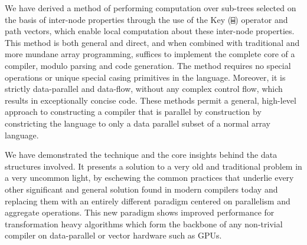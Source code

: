 ﻿\documentclass[numbers,10pt,preprint]{sigplanconf}
\begin{document}
We have derived a method of performing computation over sub-trees selected on the basis of inter-node properties through the use of the Key (\verb;⌸;) operator and path vectors, which enable local computation about these inter-node properties. This method is both general and direct, and when combined with traditional and more mundane array programming, suffices to implement the complete core of a compiler, modulo parsing and code generation. The method requires no special operations or unique special casing primitives in the language. Moreover, it is strictly data-parallel and data-flow, without any complex control flow, which results in exceptionally concise code. These methods permit a general, high-level approach to constructing a compiler that is parallel by construction by constricting the language to only a data parallel subset of a normal array language.

We have demonstrated the technique and the core insights behind the data structures involved. It presents a solution to a very old and traditional problem in a very uncommon light, by eschewing the common practices that underlie every other significant and general solution found in modern compilers today and replacing them with an entirely different paradigm centered on parallelism and aggregate operations. This new paradigm shows improved performance for transformation heavy algorithms which form the backbone of any non-trivial compiler on data-parallel or vector hardware such as GPUs. 
\balancecolumns



\end{document}
